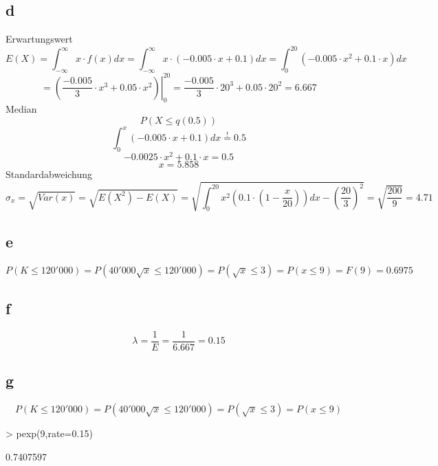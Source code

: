 \subsection{d}
Erwartungswert
\[ E(X) = \int_{-\infty}^{\infty} x \cdot f(x) dx 
= \int_{-\infty}^{\infty} x \cdot (-0.005 \cdot x + 0.1) dx 
= \int_{0}^{20}(-0.005 \cdot x^2 + 0.1 \cdot x) dx \]
\[ = \left.\left(\frac{-0.005}{3} \cdot x^3 
+ 0.05 \cdot x^2\right)\right|_{0}^{20} 
= \frac{-0.005}{3} \cdot 20^3 + 0.05 \cdot 20^2 
= 6.667 \]
Median
\[ P(X \leq q(0.5)) \]
\[ \int_0^{x}(-0.005 \cdot x + 0.1)dx \stackrel{!}{=} 0.5 \]
\[ -0.0025 \cdot x^2 + 0.1 \cdot x = 0.5 \]
\[ x = 5.858 \]
Standardabweichung
\[ \sigma_x = \sqrt{Var(x)} = \sqrt{E(X^2)-E(X)} 
= \sqrt{\int_{0}^{20} x^2 \left(0.1 \cdot 
\left(1 - \frac{x}{20}\right)\right) dx - \left(\frac{20}{3}\right)^2} 
= \sqrt{\frac{200}{9}} = 4.71 \]

\subsection{e}
\[ P(K \leq 120'000) = P(40'000 \sqrt{x} \leq 120'000) = P(\sqrt{x} \leq 3) 
= P(x \leq 9) = F(9) = 0.6975 \]

\subsection{f}
\[ \lambda = \frac{1}{E} = \frac{1}{6.667} = 0.15 \]

\subsection{g}
\[ P(K \leq 120'000) = P(40'000 \sqrt{x} \leq 120'000) = P(\sqrt{x} \leq 3) 
= P(x \leq 9) \]
\begin{Schunk}
\begin{Sinput}
> pexp(9,rate=0.15)
\end{Sinput}
\begin{Soutput}
[1] 0.7407597
\end{Soutput}
\end{Schunk}
